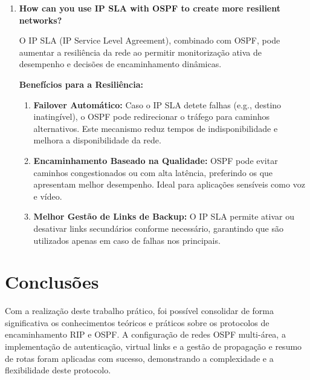 \documentclass[11pt,english, openright, oneside]{book}
\begin{document}
\begin{enumerate}
\begin{enumerate}
    \end{enumerate}
    \vspace{0.2cm}
  
  \item \textbf{How can you use IP SLA with OSPF to create more resilient networks?}
  \vspace{0.2cm}

  O IP SLA (IP Service Level Agreement), combinado com OSPF, pode aumentar a resiliência da rede ao permitir monitorização ativa de desempenho e decisões de encaminhamento dinâmicas.
  \vspace{0.2cm}

  \textbf{Benefícios para a Resiliência:}
  \vspace{0.2cm}
  \begin{enumerate}
      \item \textbf{Failover Automático:}
      Caso o IP SLA detete falhas (e.g., destino inatingível), o OSPF pode redirecionar o tráfego para caminhos alternativos. Este mecanismo reduz tempos de indisponibilidade e melhora a disponibilidade da rede.
      \item \textbf{Encaminhamento Baseado na Qualidade:}
      OSPF pode evitar caminhos congestionados ou com alta latência, preferindo os que apresentam melhor desempenho. Ideal para aplicações sensíveis como voz e vídeo.
      \item \textbf{Melhor Gestão de Links de Backup:}
      O IP SLA permite ativar ou desativar links secundários conforme necessário, garantindo que são utilizados apenas em caso de falhas nos principais.
  \end{enumerate}
  \vspace{0.2cm}
\end{enumerate}

\pagebreak

\chapter{Conclusões}
\vspace{0.2cm}

\par Com a realização deste trabalho prático, foi possível consolidar de forma significativa os conhecimentos teóricos e práticos sobre os protocolos de encaminhamento RIP e OSPF. A configuração de redes OSPF multi-área, a implementação de autenticação, virtual links e a gestão de propagação e resumo de rotas foram aplicadas com sucesso, demonstrando a complexidade e a flexibilidade deste protocolo.
\end{document}
